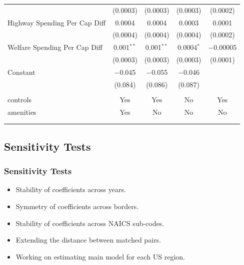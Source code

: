 \documentclass{beamer}
\begin{document}
\begin{frame}
\begin{table}[!htbp]
{{\begin{tabular}{@{\extracolsep{5pt}}lcccc}
  & (0.0003) & (0.0003) & (0.0003) & (0.0002) \\ 
  Highway Spending Per Cap Diff & 0.0004 & 0.0004 & 0.0003 & 0.0001 \\ 
  & (0.0004) & (0.0004) & (0.0004) & (0.0002) \\ 
  Welfare Spending Per Cap Diff & 0.001$^{**}$ & 0.001$^{**}$ & 0.0004$^{*}$ & $-$0.00005 \\ 
  & (0.0003) & (0.0003) & (0.0003) & (0.0001) \\ 
  Constant & $-$0.045 & $-$0.055 & $-$0.046 &  \\ 
  & (0.084) & (0.086) & (0.087) &  \\ 
 \hline \\[-1.8ex] 
controls & Yes & Yes & No & Yes \\ 
amenities & Yes & No & No & No \\ 
\hline \\[-1.8ex] 
\hline 
\hline \\[-1.8ex] 
\end{tabular}}}
\end{table} 
\end{frame}

\begin{frame}
\subsection{Sensitivity Tests}
\frametitle{Sensitivity Tests}
\begin{itemize}
\item Stability of coefficients across years.
\item Symmetry of coefficients across borders.
\item Stability of coefficients across NAICS sub-codes.
\item Extending the distance between matched pairs.
\item Working on estimating main model for each US region.
\end{itemize}
\end{frame}
\end{document}
